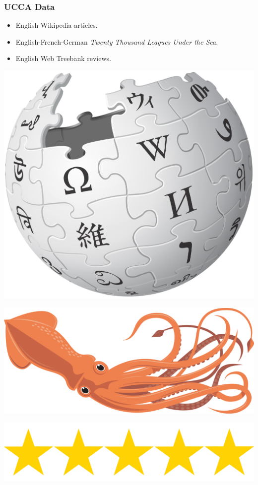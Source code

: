 \documentclass[t,xcolor={svgnames,table}]{beamer}
\begin{document}
\begin{frame}
\frametitle{UCCA Data}
\begin{itemize}
 \item English Wikipedia articles.
 \item English-French-German \textit{Twenty Thousand Leagues Under the Sea}.
 \item English Web Treebank reviews.
\end{itemize}

\vfill
\begin{center}
  \begin{minipage}{.26\textwidth}\includegraphics[width=\textwidth]{wikipedia.png}\end{minipage}
  \begin{minipage}{.3\textwidth}\includegraphics[width=\textwidth]{squid.jpg}\end{minipage}
  \begin{minipage}{.3\textwidth}\includegraphics[width=\textwidth]{five-stars.png}\end{minipage}
\end{center}
\end{frame}
\end{document}
